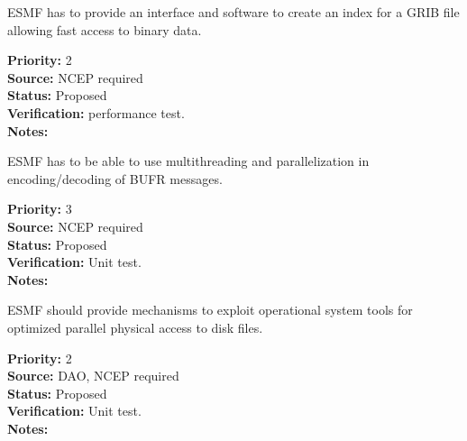 
ESMF has to provide an interface and software to create an index for a GRIB
file allowing fast access to binary data.


\begin{reqlist}
{\bf Priority:} 2 \\
{\bf Source:} NCEP required \\
{\bf Status:} Proposed \\
{\bf Verification:} performance test. \\
{\bf Notes:} 
\end{reqlist}



ESMF has to be able to use multithreading and parallelization in 
encoding/decoding of BUFR messages. 


\begin{reqlist}
{\bf Priority:} 3 \\
{\bf Source:} NCEP required \\
{\bf Status:} Proposed \\
{\bf Verification:} Unit test. \\
{\bf Notes:} 
\end{reqlist}



ESMF should provide mechanisms to exploit operational system tools for
optimized parallel physical access to disk files.


\begin{reqlist}
{\bf Priority:} 2 \\
{\bf Source:} DAO, NCEP required \\
{\bf Status:} Proposed \\
{\bf Verification:} Unit test. \\
{\bf Notes:} 
\end{reqlist}






